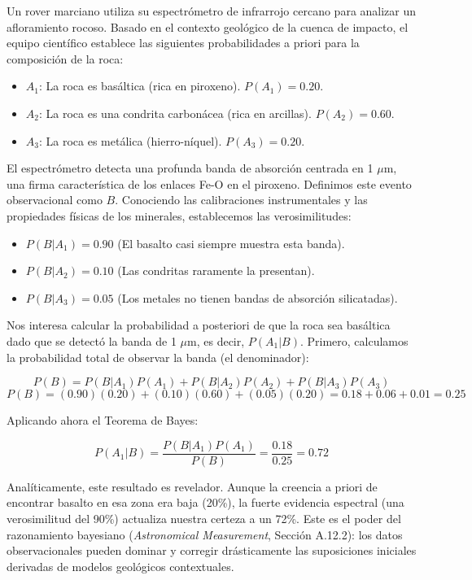 Un rover marciano utiliza su espectrómetro de infrarrojo cercano para analizar un afloramiento rocoso. Basado en el contexto geológico de la cuenca de impacto, el equipo científico establece las siguientes probabilidades a priori para la composición de la roca:
\begin{itemize}
    \item $A_1$: La roca es basáltica (rica en piroxeno). $P(A_1) = 0.20$.
    \item $A_2$: La roca es una condrita carbonácea (rica en arcillas). $P(A_2) = 0.60$.
    \item $A_3$: La roca es metálica (hierro-níquel). $P(A_3) = 0.20$.
\end{itemize}

El espectrómetro detecta una profunda banda de absorción centrada en 1 $\mu$m, una firma característica de los enlaces Fe-O en el piroxeno. Definimos este evento observacional como $B$. Conociendo las calibraciones instrumentales y las propiedades físicas de los minerales, establecemos las verosimilitudes:
\begin{itemize}
    \item $P(B | A_1) = 0.90$ (El basalto casi siempre muestra esta banda).
    \item $P(B | A_2) = 0.10$ (Las condritas raramente la presentan).
    \item $P(B | A_3) = 0.05$ (Los metales no tienen bandas de absorción silicatadas).
\end{itemize}

Nos interesa calcular la probabilidad a posteriori de que la roca sea basáltica dado que se detectó la banda de 1 $\mu$m, es decir, $P(A_1 | B)$. Primero, calculamos la probabilidad total de observar la banda (el denominador):

$$ P(B) = P(B | A_1)P(A_1) + P(B | A_2)P(A_2) + P(B | A_3)P(A_3) $$
$$ P(B) = (0.90)(0.20) + (0.10)(0.60) + (0.05)(0.20) = 0.18 + 0.06 + 0.01 = 0.25 $$

Aplicando ahora el Teorema de Bayes:

$$ P(A_1 | B) = \frac{P(B | A_1) P(A_1)}{P(B)} = \frac{0.18}{0.25} = 0.72 $$

Analíticamente, este resultado es revelador. Aunque la creencia a priori de encontrar basalto en esa zona era baja (20\%), la fuerte evidencia espectral (una verosimilitud del 90\%) actualiza nuestra certeza a un 72\%. Este es el poder del razonamiento bayesiano (\textit{Astronomical Measurement}, Sección A.12.2): los datos observacionales pueden dominar y corregir drásticamente las suposiciones iniciales derivadas de modelos geológicos contextuales.

